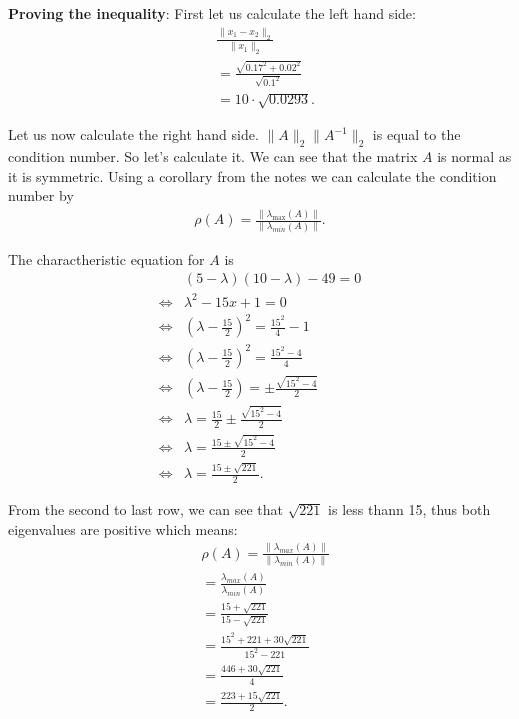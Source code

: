 \documentclass[10pt]{article}
\begin{document}
\begin{solution}[4]
\textbf{Proving the inequality}:
First let us calculate the left hand side:
\begin{align*}
 &  \frac{\| x_1 - x_2 \| _{2}}{\| x_1 \| _{2}} \\
& = \frac{\sqrt{0.17 ^2 + 0.02 ^2}}{\sqrt{0.1 ^2}} \\
& = 10 \cdot \sqrt{0.0293}
.
\end{align*}


Let us now calculate the right hand side.
\(\| A \| _{2} \| A^{-1}  \| _{2}\) is equal to the condition number. So let's calculate it.
We can see that the matrix \(A\) is normal as it is symmetric. Using a corollary
from the notes we can calculate the condition number by
\begin{align*}
\rho(A) = \frac{\| \lambda _{\max}(A) \| }{\| \lambda _{min}(A) \|} 
.
\end{align*}

The charactheristic equation for \(A\) is
\begin{align*}
 &  (5- \lambda) (10 - \lambda) - 49 = 0 \\
\iff & \lambda ^2 - 15x + 1 = 0 \\
\iff & (\lambda - \frac{15}{2}) ^2  = \frac{15 ^2}{4}  -1 \\
\iff & (\lambda - \frac{15}{2}) ^2  = \frac{15 ^2 - 4}{4} \\
\iff & (\lambda - \frac{15}{2})  = \pm \frac{\sqrt{15 ^2 - 4}}{2} \\
\iff & \lambda  = \frac{15}{2} \pm \frac{\sqrt{15 ^2 - 4}}{2} \\
\iff & \lambda  =  \frac{15 \pm \sqrt{15 ^2 - 4}}{2} \\
\iff & \lambda  =  \frac{15 \pm \sqrt{221}}{2}
.
\end{align*}

From the second to last row, we can see that \(\sqrt{221}\) is less thann 15, thus
both eigenvalues are positive which means:
\begin{align*}
 &  \rho(A) =  \frac{\| \lambda _{max}(A) \| }{\| \lambda _{min}(A) \| } \\
& = \frac{\lambda _{max}(A)}{\lambda _{min}(A)} \\
& = \frac{15 + \sqrt{221}}{15 - \sqrt{221}} \\
& = \frac{15 ^2 + 221 + 30 \sqrt{221}}{15 ^2 - 221} \\
& = \frac{446 + 30 \sqrt{221}}{4} \\
& = \frac{223 + 15 \sqrt{221}}{2} 
.
\end{align*}


\end{solution}
\end{document}

